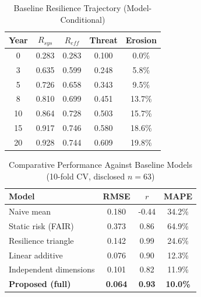 \begin{table}[H]
\centering
\caption{Baseline Resilience Trajectory (Model-Conditional)}
\label{tab:baseline_live}
\scriptsize
\renewcommand{\arraystretch}{1.15}
\begin{tabular}{ccccc}
\toprule
\textbf{Year} & \textbf{$R_{sys}$} & \textbf{$R_{eff}$} & \textbf{Threat} & \textbf{Erosion} \\
\midrule
0 & 0.283 & 0.283 & 0.100 & 0.0\% \\
3 & 0.635 & 0.599 & 0.248 & 5.8\% \\
5 & 0.726 & 0.658 & 0.343 & 9.5\% \\
8 & 0.810 & 0.699 & 0.451 & 13.7\% \\
10 & 0.864 & 0.728 & 0.503 & 15.7\% \\
15 & 0.917 & 0.746 & 0.580 & 18.6\% \\
20 & 0.928 & 0.744 & 0.609 & 19.8\% \\
\bottomrule
\end{tabular}
\end{table}

\begin{table}[H]
\centering
\caption{Comparative Performance Against Baseline Models (10-fold CV, disclosed $n=63$)}
\label{tab:validation_live}
\scriptsize
\renewcommand{\arraystretch}{1.15}
\begin{tabular}{lccc}
\toprule
\textbf{Model} & \textbf{RMSE} & \textbf{$r$} & \textbf{MAPE} \\
\midrule
Naive mean & 0.180 & -0.44 & 34.2\% \\
Static risk (FAIR) & 0.373 & 0.86 & 64.9\% \\
Resilience triangle & 0.142 & 0.99 & 24.6\% \\
Linear additive & 0.076 & 0.90 & 12.3\% \\
Independent dimensions & 0.101 & 0.82 & 11.9\% \\
\textbf{Proposed (full)} & \textbf{0.064} & \textbf{0.93} & \textbf{10.0\%} \\
\bottomrule
\end{tabular}
\end{table}

